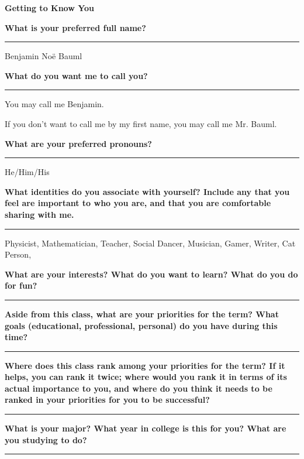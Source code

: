 \documentclass[]{article}
\begin{document}
\begin{PresentSpace}
\begin{center}
	\textbf{Getting to Know You}
\end{center}
\textbf{What is your preferred full name?}
{\color{blue}\hrule}
\begin{center}
	Benjamin No\"{e} Bauml
\end{center}
\textbf{What do you want me to call you?}
{\color{blue}\hrule}
\begin{center}
	You may call me Benjamin.
	
	If you don't want to call me by my first name, you may call me Mr. Bauml.
\end{center}
\textbf{What are your preferred pronouns?}
{\color{blue}\hrule}
\begin{center}
	He/Him/His
\end{center}
\textbf{What identities do you associate with yourself? Include any that you feel are important to who you are, and that you are comfortable sharing with me.}
{\color{blue}\hrule}
\begin{center}
	Physicist, Mathematician, Teacher, Social Dancer, Musician, Gamer, Writer, Cat Person, 
\end{center}
\textbf{What are your interests? What do you want to learn? What do you do for fun?}
{\color{blue}\hrule}
\vspace{10pt}

\noindent\textbf{Aside from this class, what are your priorities for the term? What goals (educational, professional, personal) do you have during this time?}
{\color{blue}\hrule}
\vspace{10pt}

\noindent\textbf{Where does this class rank among your priorities for the term? If it helps, you can rank it twice; where would you rank it in terms of its actual importance to you, and where do you think it needs to be ranked in your priorities for you to be successful?}
{\color{blue}\hrule}
\vspace{10pt}

\noindent\textbf{What is your major? What year in college is this for you? What are you studying to do?}
{\color{blue}\hrule}
\vspace{2pt}
\end{PresentSpace}

\end{document}
